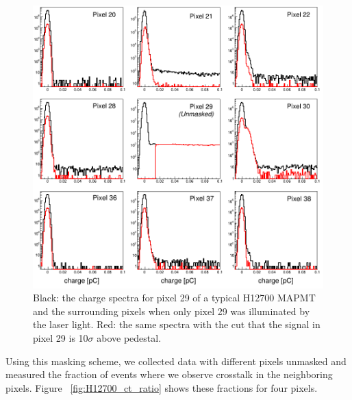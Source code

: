 \begin{figure}
	\centering
	\includegraphics[width=\linewidth]{figures/H12700_3mm_mask_config5_ct_updated.png}
	\caption{Black: the charge spectra for pixel 29 of a typical H12700 MAPMT and the surrounding pixels when only pixel 29 was illuminated by the laser light. Red: the same spectra with the cut that the signal in pixel 29 is 10$\sigma$ above pedestal.}
	\label{fig:H12700pinhole}
\end{figure}

Using this masking scheme, we collected data with different pixels unmasked and measured the fraction of events where we observe crosstalk in the neighboring pixels. Figure ~\ref{fig:H12700_ct_ratio} shows these fractions for four pixels. 

